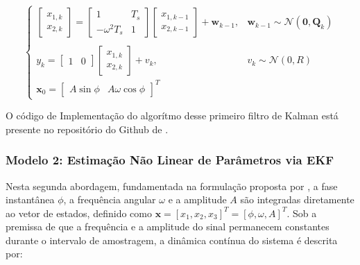 \documentclass[a4paper,12pt]{article}
\begin{document}
\begin{equation}
    \begin{cases}
        \begin{bmatrix} x_{1, k} \\ x_{2, k} \end{bmatrix} = \begin{bmatrix} 1 & T_s \\ -\omega^2 T_s & 1 \end{bmatrix} \begin{bmatrix} x_{1, k-1} \\ x_{2, k-1} \end{bmatrix} + \mathbf{w}_{k-1}, & \mathbf{w}_{k-1} \sim \mathcal{N}(\mathbf{0}, \mathbf{Q}_k) \\ \\
        y_k = \begin{bmatrix} 1 & 0 \end{bmatrix} \begin{bmatrix} x_{1, k} \\ x_{2, k} \end{bmatrix} + v_k, & v_k \sim \mathcal{N}(0, R) \\
        \mathbf{x}_0 = \begin{bmatrix}
            A\sin{\phi} &A\omega\cos{\phi}
        \end{bmatrix}^T
    \end{cases}
    \label{eq:mod1_sistema_discreto_completo}
\end{equation}

O código de Implementação do algorítmo desse primeiro filtro de Kalman está presente no repositório do Github de .



\subsubsection{Modelo 2: Estimação Não Linear de Parâmetros via EKF}
\label{subsubsec:modelo2}

Nesta segunda abordagem, fundamentada na formulação proposta por , a fase instantânea $\phi$, a frequência angular $\omega$ e a amplitude $A$ são integradas diretamente ao vetor de estados, definido como $\mathbf{x} = [x_1, x_2, x_3]^T = [\phi, \omega, A]^T$. Sob a premissa de que a frequência e a amplitude do sinal permanecem constantes durante o intervalo de amostragem, a dinâmica contínua do sistema é descrita por:
\end{document}
